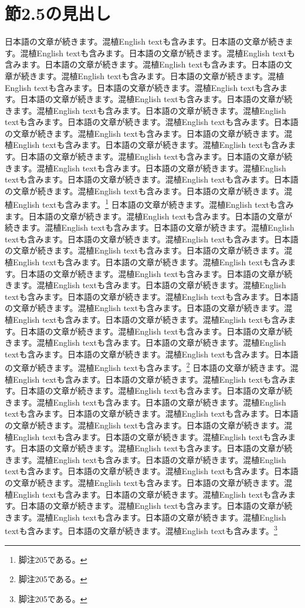 \documentclass[pdflatex,book]{jlreq}
\begin{document}
\section{節2.5の見出し}
日本語の文章が続きます。混植English textも含みます。日本語の文章が続きます。混植English textも含みます。日本語の文章が続きます。混植English textも含みます。日本語の文章が続きます。混植English textも含みます。日本語の文章が続きます。混植English textも含みます。日本語の文章が続きます。混植English textも含みます。日本語の文章が続きます。混植English textも含みます。日本語の文章が続きます。混植English textも含みます。日本語の文章が続きます。混植English textも含みます。日本語の文章が続きます。混植English textも含みます。日本語の文章が続きます。混植English textも含みます。日本語の文章が続きます。混植English textも含みます。日本語の文章が続きます。混植English textも含みます。日本語の文章が続きます。混植English textも含みます。日本語の文章が続きます。混植English textも含みます。日本語の文章が続きます。混植English textも含みます。日本語の文章が続きます。混植English textも含みます。日本語の文章が続きます。混植English textも含みます。日本語の文章が続きます。混植English textも含みます。日本語の文章が続きます。混植English textも含みます。\footnote{脚注205である。}
日本語の文章が続きます。混植English textも含みます。日本語の文章が続きます。混植English textも含みます。日本語の文章が続きます。混植English textも含みます。日本語の文章が続きます。混植English textも含みます。日本語の文章が続きます。混植English textも含みます。日本語の文章が続きます。混植English textも含みます。日本語の文章が続きます。混植English textも含みます。日本語の文章が続きます。混植English textも含みます。日本語の文章が続きます。混植English textも含みます。日本語の文章が続きます。混植English textも含みます。日本語の文章が続きます。混植English textも含みます。日本語の文章が続きます。混植English textも含みます。日本語の文章が続きます。混植English textも含みます。日本語の文章が続きます。混植English textも含みます。日本語の文章が続きます。混植English textも含みます。日本語の文章が続きます。混植English textも含みます。日本語の文章が続きます。混植English textも含みます。日本語の文章が続きます。混植English textも含みます。日本語の文章が続きます。混植English textも含みます。日本語の文章が続きます。混植English textも含みます。\footnote{脚注205である。}
日本語の文章が続きます。混植English textも含みます。日本語の文章が続きます。混植English textも含みます。日本語の文章が続きます。混植English textも含みます。日本語の文章が続きます。混植English textも含みます。日本語の文章が続きます。混植English textも含みます。日本語の文章が続きます。混植English textも含みます。日本語の文章が続きます。混植English textも含みます。日本語の文章が続きます。混植English textも含みます。日本語の文章が続きます。混植English textも含みます。日本語の文章が続きます。混植English textも含みます。日本語の文章が続きます。混植English textも含みます。日本語の文章が続きます。混植English textも含みます。日本語の文章が続きます。混植English textも含みます。日本語の文章が続きます。混植English textも含みます。日本語の文章が続きます。混植English textも含みます。日本語の文章が続きます。混植English textも含みます。日本語の文章が続きます。混植English textも含みます。日本語の文章が続きます。混植English textも含みます。日本語の文章が続きます。混植English textも含みます。日本語の文章が続きます。混植English textも含みます。\footnote{脚注205である。}
\end{document}
